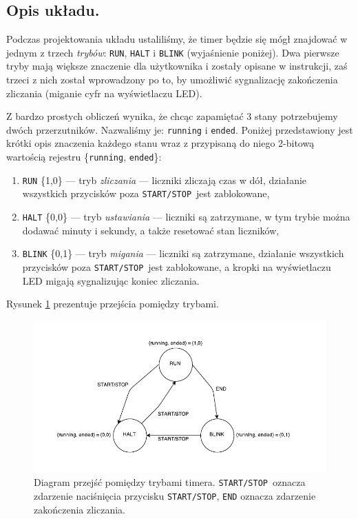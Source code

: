 \documentclass[a4paper,oneside]{report}
\newcommand{\startstop}{\texttt{START/STOP}}
\begin{document}
\subsection{Opis układu.}
Podczas projektowania układu ustaliliśmy, że timer będzie się mógł
znajdować w jednym z trzech \emph{trybów}: \texttt{RUN},
\texttt{HALT} i \texttt{BLINK} (wyjaśnienie poniżej). Dwa pierwsze
tryby mają większe znaczenie dla użytkownika i zostały opisane w
instrukcji, zaś trzeci z nich został wprowadzony po to, by
umożliwić sygnalizację zakończenia zliczania (miganie cyfr
na wyświetlaczu LED).

Z bardzo prostych obliczeń wynika, że chcąc zapamiętać 3 stany
potrzebujemy dwóch przerzutników. Nazwaliśmy je: \texttt{running} i
\texttt{ended}. Poniżej przedstawiony jest krótki opis znaczenia
każdego stanu wraz z przypisaną do niego 2-bitową wartością
rejestru \{\texttt{running}, \texttt{ended}\}:
\begin{enumerate}
\item \texttt{RUN} \{1,0\} --- tryb \emph{zliczania} --- liczniki
zliczają czas w dół, działanie wszystkich przycisków poza
\startstop\ jest zablokowane,
\item \texttt{HALT} \{0,0\} --- tryb \emph{ustawiania} --- liczniki
są zatrzymane, w tym trybie można dodawać minuty i sekundy, a także
resetować stan liczników,
\item \texttt{BLINK} \{0,1\} --- tryb \emph{migania} --- liczniki
są zatrzymane, działanie wszystkich przycisków poza \startstop\
jest zablokowane, a kropki na wyświetlaczu LED migają sygnalizując
koniec zliczania.
\end{enumerate}

Rysunek \ref{state_diagram} prezentuje przejścia pomiędzy trybami.
\begin{figure}[htbp]
\centering
\includegraphics{state_diagram.pdf}
\caption[Diagram przejść pomiędzy trybami timera.]{Diagram przejść
pomiędzy trybami timera. \startstop\ oznacza zdarzenie naciśnięcia
przycisku \startstop , \texttt{END} oznacza zdarzenie zakończenia
zliczania.}
\label{state_diagram}
\end{figure}
\end{document}
